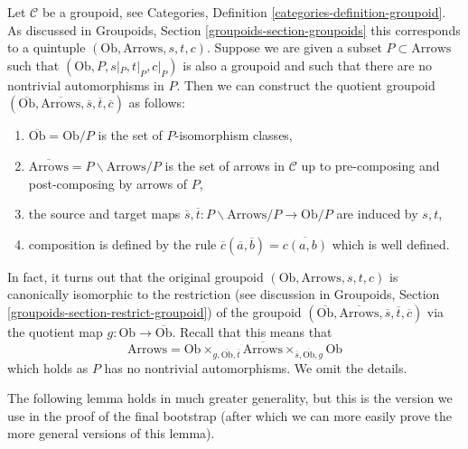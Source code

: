\medskip\noindent
Let $\mathcal{C}$ be a groupoid, see
Categories, Definition \ref{categories-definition-groupoid}.
As discussed in
Groupoids, Section \ref{groupoids-section-groupoids}
this corresponds to a quintuple $(\text{Ob}, \text{Arrows}, s, t, c)$.
Suppose we are given a subset $P \subset \text{Arrows}$ such that
$(\text{Ob}, P, s|_P, t|_P, c|_P)$ is also a groupoid and such
that there are no nontrivial automorphisms in $P$. Then we can construct
the quotient groupoid
$(\overline{\text{Ob}}, \overline{\text{Arrows}}, \overline{s},
\overline{t}, \overline{c})$
as follows:
\begin{enumerate}
\item $\overline{\text{Ob}} = \text{Ob}/P$
is the set of $P$-isomorphism classes,
\item $\overline{\text{Arrows}} = P\backslash \text{Arrows}/P$
is the set of arrows in $\mathcal{C}$ up to pre-composing and
post-composing by arrows of $P$,
\item the source and target maps
$\overline{s}, \overline{t} : P\backslash \text{Arrows}/P \to \text{Ob}/P$
are induced by $s, t$,
\item composition is defined by the rule
$\overline{c}(\overline{a}, \overline{b}) = \overline{c(a, b)}$
which is well defined.
\end{enumerate}
In fact, it turns out that the original groupoid
$(\text{Ob}, \text{Arrows}, s, t, c)$ is canonically
isomorphic to the restriction (see discussion in
Groupoids, Section \ref{groupoids-section-restrict-groupoid})
of the groupoid
$(\overline{\text{Ob}}, \overline{\text{Arrows}}, \overline{s},
\overline{t}, \overline{c})$ via the quotient map
$g : \text{Ob} \to \overline{\text{Ob}}$. Recall that this means
that
$$
\text{Arrows} =
\text{Ob}
\times_{g, \overline{\text{Ob}}, \overline{t}}
\overline{\text{Arrows}}
\times_{\overline{s}, \overline{\text{Ob}}, g}
\text{Ob}
$$
which holds as $P$ has no nontrivial automorphisms.
We omit the details.

\medskip\noindent
The following lemma holds in much greater generality, but this is
the version we use in the proof of the final bootstrap (after which
we can more easily prove the more general versions of this lemma).

